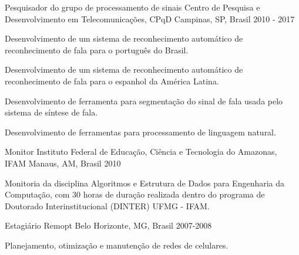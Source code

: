 

\begin{cventries}

  \cventry
    {Pesquisador do grupo de processamento de sinais} %
    {Centro de Pesquisa e Desenvolvimento em Telecomunicações, CPqD} %
    {Campinas, SP, Brasil} %
    {2010 - 2017} %
    {
      \begin{cvitems} %
        \item {Desenvolvimento de um sistema de reconhecimento automático de reconhecimento de fala para o português do Brasil.}
        \item {Desenvolvimento de um sistema de reconhecimento automático de reconhecimento de fala para o espanhol da América Latina.}
        \item {Desenvolvimento de ferramenta para segmentação do sinal de fala usada pelo sistema de síntese de fala.}
        \item {Desenvolvimento de ferramentas para processamento de linguagem natural.}
      \end{cvitems}
    }

  \cventry
    {Monitor} %
    {Instituto Federal de Educação, Ciência e Tecnologia do Amazonas, IFAM} %
    {Manaus, AM, Brasil} %
    {2010} %
    {
      \begin{cvitems} %
        \item {Monitoria da disciplina Algoritmos e Estrutura de Dados para Engenharia da Computação, com 30 horas de duração realizada dentro do programa de Doutorado Interinstitucional (DINTER) UFMG - IFAM.}
      \end{cvitems}
    }

  \cventry
    {Estagiário} %
    {Remopt} %
    {Belo Horizonte, MG, Brasil} %
    {2007-2008} %
    {
      \begin{cvitems} %
        \item {Planejamento, otimização e manutenção de redes de celulares.}
      \end{cvitems}
    }


\end{cventries}
